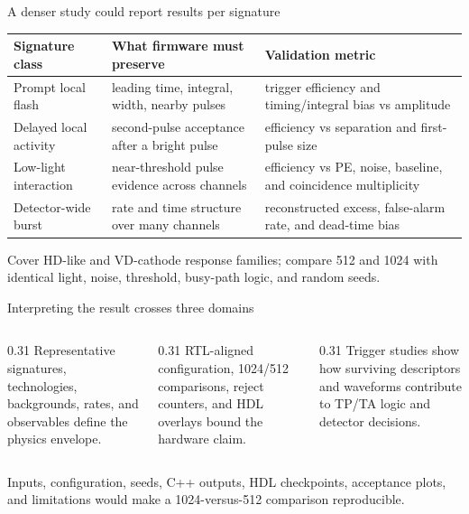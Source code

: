 \documentclass[aspectratio=169,11pt]{beamer}
\begin{document}
\begin{frame}{A denser study could report results per signature}
  \small
  \begin{tabular}{@{}p{}p{}p{}@{}}
    \toprule
    Signature class & What firmware must preserve & Validation metric \\
    \midrule
    Prompt local flash & leading time, integral, width, nearby pulses & trigger efficiency and timing/integral bias vs amplitude \\
    Delayed local activity & second-pulse acceptance after a bright pulse & efficiency vs separation and first-pulse size \\
    Low-light interaction & near-threshold pulse evidence across channels & efficiency vs PE, noise, baseline, and coincidence multiplicity \\
    Detector-wide burst & rate and time structure over many channels & reconstructed excess, false-alarm rate, and dead-time bias \\
    \bottomrule
  \end{tabular}

  \medskip
    {Cover HD-like and VD-cathode response families; compare 512 and 1024 with identical light, noise, threshold, busy-path logic, and random seeds.}
\end{frame}

\begin{frame}{Interpreting the result crosses three domains}
  \begin{columns}[T,onlytextwidth]
    \begin{column}{0.31\textwidth}
        {Representative signatures, technologies, backgrounds, rates, and observables define the physics envelope.}
    \end{column}
    \begin{column}{0.31\textwidth}
        {RTL-aligned configuration, 1024/512 comparisons, reject counters, and HDL overlays bound the hardware claim.}
    \end{column}
    \begin{column}{0.31\textwidth}
        {Trigger studies show how surviving descriptors and waveforms contribute to TP/TA logic and detector decisions.}
    \end{column}
  \end{columns}

  \smallskip
    {Inputs, configuration, seeds, C++ outputs, HDL checkpoints, acceptance plots, and limitations would make a 1024-versus-512 comparison reproducible.}
\end{frame}
\end{document}
